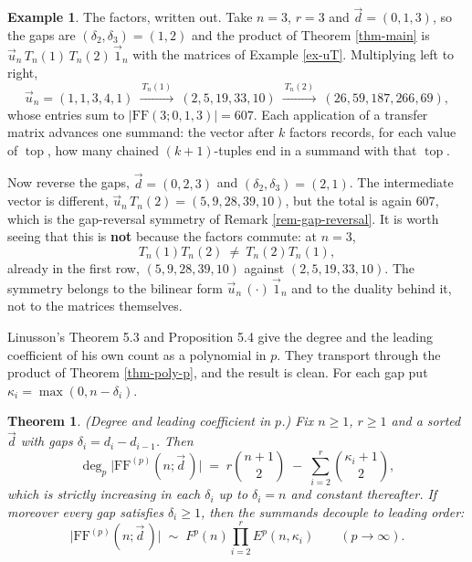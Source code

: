 \documentclass[11pt, a4paper, abstract=yes]{scrartcl}
\theoremstyle{definition}
\newtheorem{mexample}[definition]{Example}
\theoremstyle{remark}
\theoremstyle{plain}
\newtheorem{theorem}[definition]{Theorem}
\newcommand{\tp}{\operatorname{top}}
\begin{document}
\begin{mexample}
The factors, written out. Take \(n=3\), \(r=3\) and \(\vec d=(0,1,3)\), so the gaps are
\((\delta_2,\delta_3)=(1,2)\) and the product of Theorem \ref{thm-main} is \(\vec u_n\,T_n(1)\,T_n(2)\,\vec1_n\)
with the matrices of Example \ref{ex-uT}. Multiplying left to right,
\[
  \vec u_n=(1,1,3,4,1)
  \ \xrightarrow{\ T_n(1)\ }\ (2,5,19,33,10)
  \ \xrightarrow{\ T_n(2)\ }\ (26,59,187,266,69),
\]
whose entries sum to \(\lvert\mathrm{FF}(3;0,1,3)\rvert=607\). Each application of a transfer matrix
advances one summand: the vector after \(k\) factors records, for each value of \(\tp\), how many
chained \((k+1)\)-tuples end in a summand with that \(\tp\).

Now reverse the gaps, \(\vec d=(0,2,3)\) and \((\delta_2,\delta_3)=(2,1)\). The intermediate vector is
different, \(\vec u_n\,T_n(2)=(5,9,28,39,10)\), but the total is again \(607\), which is the
gap-reversal symmetry of Remark \ref{rem-gap-reversal}. It is worth seeing that this is \textbf{not} because
the factors commute: at \(n=3\),
\[
  T_n(1)T_n(2)\ \ne\ T_n(2)T_n(1),
\]
already in the first row, \((5,9,28,39,10)\) against \((2,5,19,33,10)\). The symmetry belongs to the
bilinear form \(\vec u_n\,(\cdot)\,\vec1_n\) and to the duality behind it, not to the matrices
themselves.
\label{ex-factors}
\end{mexample}

Linusson's Theorem 5.3 and Proposition 5.4 give the degree and the leading coefficient of his own
count as a polynomial in \(p\). They transport through the product of Theorem \ref{thm-poly-p}, and the
result is clean. For each gap put \(\kappa_i=\max(0,n-\delta_i)\).

\begin{theorem}
(\emph{Degree and leading coefficient in \(p\).}) Fix \(n\ge1\), \(r\ge1\) and a sorted \(\vec d\) with
gaps \(\delta_i=d_i-d_{i-1}\). Then
\begin{equation}\label{eq:degree-in-p}
  \deg_p\lvert\mathrm{FF}^{(p)}(n;\vec d\,)\rvert
   \;=\; r\binom{n+1}{2}\;-\;\sum_{i=2}^{r}\binom{\kappa_i+1}{2},
\end{equation}
which is strictly increasing in each \(\delta_i\) up to \(\delta_i=n\) and constant thereafter. If
moreover every gap satisfies \(\delta_i\ge1\), then the summands decouple to leading order:
\begin{equation}\label{eq:lc-in-p}
  \lvert\mathrm{FF}^{(p)}(n;\vec d\,)\rvert\;\sim\;F^p(n)\prod_{i=2}^{r}E^p(n,\kappa_i)
  \qquad(p\to\infty).
\end{equation}
\label{thm-asymptotics-p}
\end{theorem}
\end{document}

